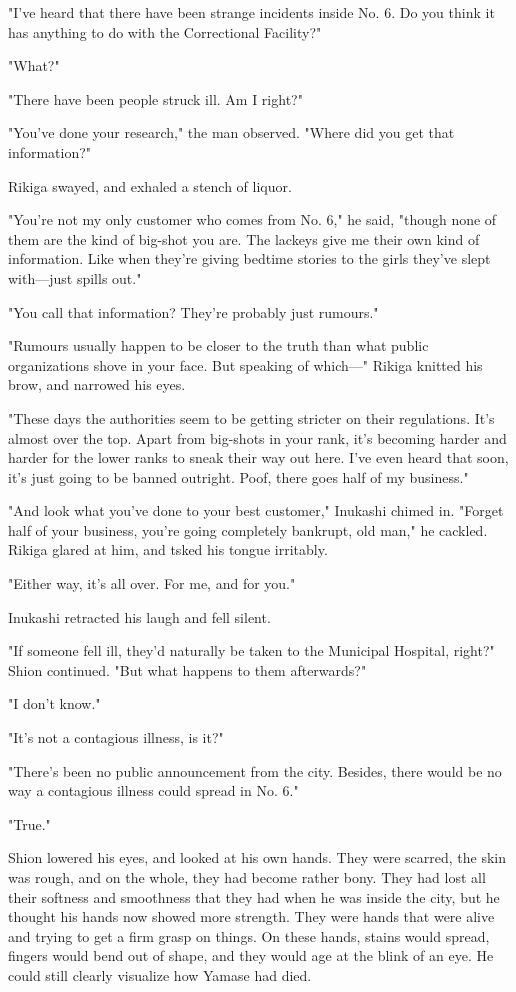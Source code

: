 "I've heard that there have been strange incidents inside No. 6. Do you
think it has anything to do with the Correctional Facility?"

"What?"

"There have been people struck ill. Am I right?"

"You've done your research," the man observed. "Where did you get that
information?"

Rikiga swayed, and exhaled a stench of liquor.

"You're not my only customer who comes from No. 6," he said, "though
none of them are the kind of big-shot you are. The lackeys give me their
own kind of information. Like when they're giving bedtime stories to the
girls they've slept with---just spills out."

"You call that information? They're probably just rumours."

"Rumours usually happen to be closer to the truth than what public
organizations shove in your face. But speaking of which---" Rikiga knitted
his brow, and narrowed his eyes.

"These days the authorities seem to be getting stricter on their
regulations. It's almost over the top. Apart from big-shots in your
rank, it's becoming harder and harder for the lower ranks to sneak their
way out here. I've even heard that soon, it's just going to be banned
outright. Poof, there goes half of my business."

"And look what you've done to your best customer," Inukashi chimed in.
"Forget half of your business, you're going completely bankrupt, old
man," he cackled. Rikiga glared at him, and tsked his tongue irritably.

"Either way, it's all over. For me, and for you."

Inukashi retracted his laugh and fell silent.

"If someone fell ill, they'd naturally be taken to the Municipal
Hospital, right?" Shion continued. "But what happens to them
afterwards?"

"I don't know."

"It's not a contagious illness, is it?"

"There's been no public announcement from the city. Besides, there would
be no way a contagious illness could spread in No. 6."

"True."

Shion lowered his eyes, and looked at his own hands. They were scarred,
the skin was rough, and on the whole, they had become rather bony. They
had lost all their softness and smoothness that they had when he was
inside the city, but he thought his hands now showed more strength. They
were hands that were alive and trying to get a firm grasp on things. On
these hands, stains would spread, fingers would bend out of shape, and
they would age at the blink of an eye. He could still clearly visualize
how Yamase had died.

